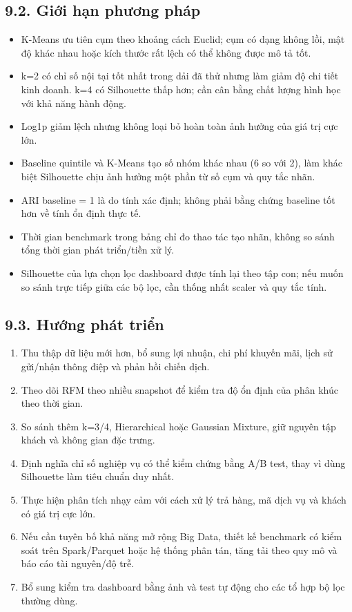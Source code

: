 \documentclass[a4paper]{article}
\begin{document}
\subsection*{9.2. Giới hạn phương pháp}

\begin{itemize}
\item K-Means ưu tiên cụm theo khoảng cách Euclid; cụm có dạng không lồi, mật độ khác nhau hoặc kích thước rất lệch có thể không được mô tả tốt.
\item k=2 có chỉ số nội tại tốt nhất trong dải đã thử nhưng làm giảm độ chi tiết kinh doanh. k=4 có Silhouette thấp hơn; cần cân bằng chất lượng hình học với khả năng hành động.
\item Log1p giảm lệch nhưng không loại bỏ hoàn toàn ảnh hưởng của giá trị cực lớn.
\item Baseline quintile và K-Means tạo số nhóm khác nhau (6 so với 2), làm khác biệt Silhouette chịu ảnh hưởng một phần từ số cụm và quy tắc nhãn.
\item ARI baseline = 1 là do tính xác định; không phải bằng chứng baseline tốt hơn về tính ổn định thực tế.
\item Thời gian benchmark trong bảng chỉ đo thao tác tạo nhãn, không so sánh tổng thời gian phát triển/tiền xử lý.
\item Silhouette của lựa chọn lọc dashboard được tính lại theo tập con; nếu muốn so sánh trực tiếp giữa các bộ lọc, cần thống nhất scaler và quy tắc tính.
\end{itemize}

\subsection*{9.3. Hướng phát triển}

\begin{enumerate}
\item Thu thập dữ liệu mới hơn, bổ sung lợi nhuận, chi phí khuyến mãi, lịch sử gửi/nhận thông điệp và phản hồi chiến dịch.
\item Theo dõi RFM theo nhiều snapshot để kiểm tra độ ổn định của phân khúc theo thời gian.
\item So sánh thêm k=3/4, Hierarchical hoặc Gaussian Mixture, giữ nguyên tập khách và không gian đặc trưng.
\item Định nghĩa chỉ số nghiệp vụ có thể kiểm chứng bằng A/B test, thay vì dùng Silhouette làm tiêu chuẩn duy nhất.
\item Thực hiện phân tích nhạy cảm với cách xử lý trả hàng, mã dịch vụ và khách có giá trị cực lớn.
\item Nếu cần tuyên bố khả năng mở rộng Big Data, thiết kế benchmark có kiểm soát trên Spark/Parquet hoặc hệ thống phân tán, tăng tải theo quy mô và báo cáo tài nguyên/độ trễ.
\item Bổ sung kiểm tra dashboard bằng ảnh và test tự động cho các tổ hợp bộ lọc thường dùng.
\end{enumerate}
\end{document}
